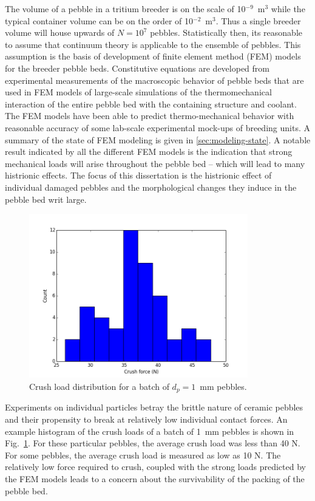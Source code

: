 The volume of a pebble in a tritium breeder is on the scale of 10$^{-9}$~m$^3$ while the typical container volume can be on the order of 10$^{-2}$~m$^3$\cite{Cho2008}.  Thus a single breeder volume will house upwards of $N = 10^7$ pebbles. Statistically then, its reasonable to assume that continuum theory is applicable to the ensemble of pebbles. This assumption is the basis of development of finite element method (FEM) models for the breeder pebble beds. Constitutive equations are developed from experimental measurements of the macroscopic behavior of pebble beds that are used in FEM models of large-scale simulations of the thermomechanical interaction of the entire pebble bed with the containing structure and coolant. The FEM models have been able to predict thermo-mechanical behavior with reasonable accuracy of some lab-scale experimental mock-ups of breeding units.\cite{DiMaio20081287,Zaccari20081282,Gan:2009vn} A summary of the state of FEM modeling is given in \cref{sec:modeling-state}. A notable result indicated by all the different FEM models is the indication that strong mechanical loads will arise throughout the pebble bed -- which will lead to many histrionic effects. The focus of this dissertation is the histrionic effect of individual damaged pebbles and the morphological changes they induce in the pebble bed writ large.

\begin{figure}[ht]
	\centering
	\includegraphics[width=0.85\textwidth]{chapters/figures/fmax} 
	\caption{Crush load distribution for a batch of $d_p = 1$~mm \lit pebbles.}
	\label{fig:fmax}
\end{figure}


Experiments on individual particles betray the brittle nature of ceramic pebbles and their propensity to break at relatively low individual contact forces. An example histogram of the crush loads of a batch of 1~mm \lit pebbles is shown in Fig.~\ref{fig:fmax}. For these particular pebbles, the average crush load was less than 40 N. For some \lis pebbles, the average crush load is measured as low as 10 N. The relatively low force required to crush, coupled with the strong loads predicted by the FEM models leads to a concern about the survivability of the packing of the pebble bed.

